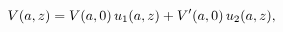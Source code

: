 \[\mathop{V\/}\nolimits\!\left(a,z\right)=\mathop{V\/}\nolimits\!\left(a,0\right%
)u_{1}(a,z)+\mathop{V\/}\nolimits'\!\left(a,0\right)u_{2}(a,z),\]